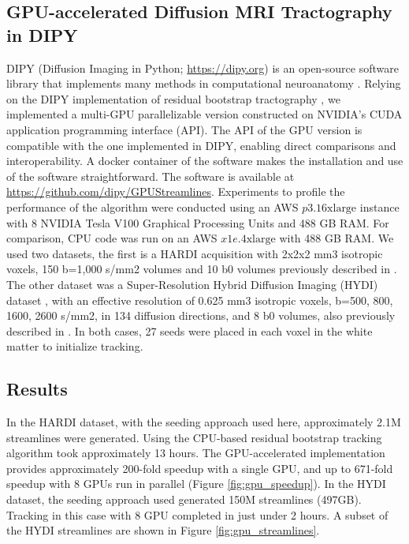 \subsection{GPU-accelerated Diffusion MRI Tractography in DIPY}
DIPY (Diffusion Imaging in Python; \url{https://dipy.org}) is an open-source software library that implements many methods in computational neuroanatomy \cite{garyfallidis_dipy_2014}. Relying on the DIPY implementation of residual bootstrap tractography \cite{berman_probabilistic_2008}, we implemented a multi-GPU parallelizable version constructed on NVIDIA’s CUDA application programming interface (API).  The API of the GPU version is compatible with the one implemented in DIPY, enabling direct comparisons and interoperability. A docker container of the software makes the installation and use of the software straightforward. The software is available at \url{https://github.com/dipy/GPUStreamlines}. Experiments to profile the performance of the algorithm were conducted using an AWS $p3.16\textrm{xlarge}$ instance with 8 NVIDIA Tesla V100 Graphical Processing Units and 488 GB RAM. For comparison, CPU code was run on an AWS $x1e.4\textrm{xlarge}$ with 488 GB RAM. We used two datasets, the first is a HARDI acquisition with 2x2x2 mm3 isotropic voxels, 150 b=1,000 s/mm2 volumes and 10 b0 volumes previously described in \cite{rokem_evaluating_2015}. The other dataset was a Super-Resolution Hybrid Diffusion Imaging  (HYDI) dataset \cite{Garyfallidis2019}, with an effective resolution of 0.625 mm3 isotropic voxels, b=500, 800, 1600, 2600 s/mm2, in 134 diffusion directions, and 8 b0 volumes, also previously described in \cite{elsaid_super-resolution_2019}. In both cases, 27 seeds were placed in each voxel in the white matter to initialize tracking.

\subsection{Results} 
In the HARDI dataset, with the seeding approach used
here, approximately 2.1M streamlines were generated. Using the CPU-based
residual bootstrap tracking algorithm took approximately 13 hours. The
GPU-accelerated implementation provides approximately 200-fold speedup
with a single GPU, and up to 671-fold speedup with 8 GPUs run in
parallel (Figure \ref{fig:gpu_speedup}). In the HYDI dataset, the seeding approach used generated 150M streamlines (497GB). Tracking in this case with 8 GPU
completed in just under 2 hours. A subset of the HYDI streamlines are
shown in Figure \ref{fig:gpu_streamlines}.


